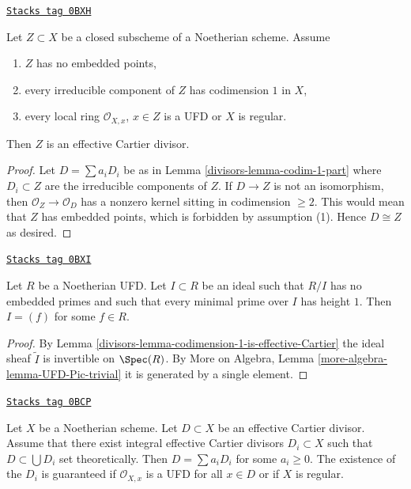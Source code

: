 \begin{lemma}
\label{divisors-lemma-codimension-1-is-effective-Cartier}
\href{https://stacks.math.columbia.edu/tag/0BXH}{\texttt{Stacks tag 0BXH}}

Let $Z \subset X$ be a closed subscheme of a Noetherian scheme. Assume
\begin{enumerate}
\item $Z$ has no embedded points,
\item every irreducible component of $Z$ has codimension $1$ in $X$,
\item every local ring $\mathcal{O}_{X, x}$, $x \in Z$ is
a UFD or $X$ is regular.
\end{enumerate}
Then $Z$ is an effective Cartier divisor.
\end{lemma}

\begin{proof}

Let $D = \sum a_i D_i$ be as in Lemma \ref{divisors-lemma-codim-1-part}
where $D_i \subset Z$ are the irreducible components of $Z$.
If $D \to Z$ is not an isomorphism, then $\mathcal{O}_Z \to \mathcal{O}_D$
has a nonzero kernel sitting in codimension $\geq 2$. This
would mean that $Z$ has embedded points, which is forbidden
by assumption (1). Hence $D \cong Z$ as desired.
\end{proof}

\begin{lemma}
\label{divisors-lemma-UFD-one-equation-CM}
\href{https://stacks.math.columbia.edu/tag/0BXI}{\texttt{Stacks tag 0BXI}}

Let $R$ be a Noetherian UFD. Let $I \subset R$ be an ideal
such that $R/I$ has no embedded primes and such that
every minimal prime over $I$ has height $1$.
Then $I = (f)$ for some $f \in R$.
\end{lemma}

\begin{proof}

By Lemma \ref{divisors-lemma-codimension-1-is-effective-Cartier}
the ideal sheaf $\tilde I$ is invertible on $\Spec(R)$.
By More on Algebra, Lemma \ref{more-algebra-lemma-UFD-Pic-trivial}
it is generated by a single element.
\end{proof}

\begin{lemma}
\label{divisors-lemma-effective-Cartier-divisor-is-a-sum}
\href{https://stacks.math.columbia.edu/tag/0BCP}{\texttt{Stacks tag 0BCP}}

Let $X$ be a Noetherian scheme. Let $D \subset X$ be an effective
Cartier divisor. Assume that there exist integral effective Cartier
divisors $D_i \subset X$ such that $D \subset \bigcup D_i$
set theoretically. Then $D = \sum a_i D_i$ for some $a_i \geq 0$.
The existence of the $D_i$ is guaranteed if $\mathcal{O}_{X, x}$
is a UFD for all $x \in D$ or if $X$ is regular.
\end{lemma}

